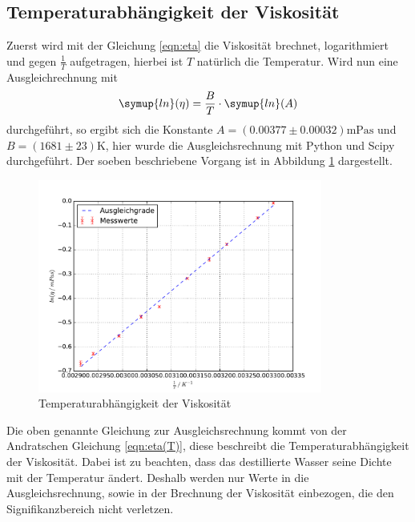 \subsection{Temperaturabhängigkeit der Viskosität}
Zuerst wird mit der Gleichung \eqref{eqn:eta} die Viskosität brechnet, logarithmiert
und gegen $\frac{1}{T}$ aufgetragen, hierbei ist $T$ natürlich die Temperatur.
Wird nun eine Ausgleichrechnung mit
\begin{equation*}
  \symup{ln}(\eta)= \frac{B}{T}\cdot\symup{ln}(A)
\end{equation*}
durchgeführt, so ergibt sich die Konstante $ A =  (0.00377 \pm 0.00032)
\si{\milli\pascal\second}$ und $B = (1681 \pm 23) \si{\kelvin}$, hier wurde
die Ausgleichsrechnung mit Python und Scipy \cite{scipy} durchgeführt. Der soeben
beschriebene Vorgang ist in Abbildung \ref{fig:plot} dargestellt.
\begin{figure}
  \centering
  \includegraphics[height= 7cm]{Plots/plot.pdf}
  \caption{Temperaturabhängigkeit der Viskosität}
  \label{fig:plot}
\end{figure}
Die oben genannte Gleichung zur Ausgleichsrechnung kommt von der Andratschen
Gleichung \eqref{eqn:eta(T)}, diese beschreibt die Temperaturabhängigkeit der
Viskosität.
Dabei ist zu beachten,
dass das destillierte Wasser seine Dichte mit der Temperatur ändert. Deshalb
werden nur Werte in die Ausgleichsrechnung, sowie in der Brechnung der
Viskosität einbezogen, die den Signifikanzbereich nicht verletzen.
